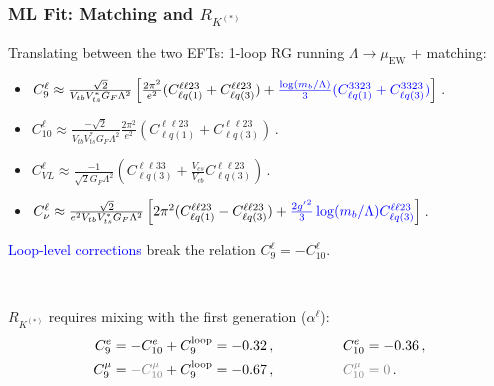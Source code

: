 \documentclass[mathserif, 10pt, dvipsnames]{beamer}
\begin{document}
\begin{frame}\frametitle{ML Fit: Matching and $R_{K^{(*)}}$}
    Translating between the two EFTs: 1-loop RG running $\Lambda \to \mu_\mathrm{EW}$ + matching:
    \begin{itemize}
        \item {\small $C_9^\ell \approx \frac{\sqrt{2}}{V_{tb}V_{ts}^* G_F \Lambda^2}\left[ \frac{2\pi^2}{e^2}(C_{\ell q(1)}^{\ell\ell23}+C_{\ell q(3)}^{\ell\ell23}) + \textcolor{blue}{\frac{\log(m_b/\Lambda)}{3}(C_{\ell q(1)}^{3323}+C_{\ell q(3)}^{3323})}\right]\, $.}
        \item {\small $C_{10}^\ell \approx \frac{-\sqrt{2}}{V_{tb}V_{ts}^* G_F \Lambda^2} \frac{2\pi^2}{e^2}(C_{\ell q(1)}^{\ell\ell23}+C_{\ell q(3)}^{\ell\ell23}) \, $.}
        \item {\small $C_{VL}^\ell \approx \frac{-1}{\sqrt{2}G_F\Lambda^2}\left(C_{\ell q(3)}^{\ell\ell33}+ \frac{V_{cs}}{V_{cb}}C_{\ell q(3)}^{\ell\ell 23}\right)$\,.}
        \item {\small $C_\nu^\ell \approx \frac{\sqrt{2}}{e^2 V_{tb}V_{ts}^* G_F \Lambda^2}\left[2\pi^2(C_{\ell q(1)}^{\ell\ell 23}-C_{\ell q(3)}^{\ell\ell 23})+\textcolor{blue}{\frac{2{g'}^2}{3}\log(m_b/\Lambda)C_{\ell q(3)}^{\ell\ell 23}}\right]\,$.}
    \end{itemize}

    \textcolor{blue}{Loop-level corrections} break the relation $C_9^\ell = -C_{10}^\ell$.

    ~

    $R_{K^{(*)}}$ requires mixing with the first generation ($\alpha^\ell$):
    \begin{align*}
        C_9^e   & = -C_{10}^e + C_9^\mathrm{loop} = -0.32\,, \qquad\qquad                 &  & C_{10}^e =-0.36\,,             \\
        C_9^\mu & = {\color{gray}-C_{10}^\mu} + C_9^\mathrm{loop} = -0.67\,, \qquad\qquad &  & {\color{gray}C_{10}^\mu =0}\,.
    \end{align*}

\end{frame}
\end{document}
